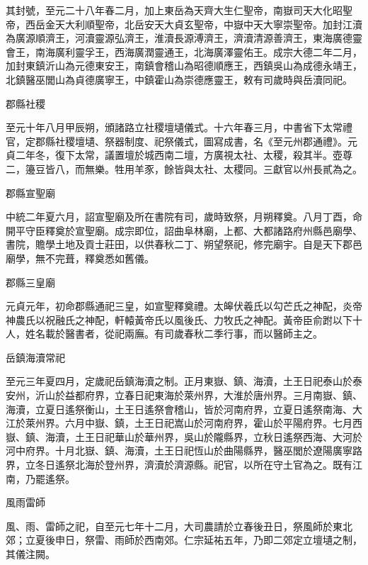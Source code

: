 \begin{pinyinscope}
 其封號，至元二十八年春二月，加上東岳為天齊大生仁聖帝，南嶽司天大化昭聖帝，西岳金天大利順聖帝，北岳安天大貞玄聖帝，中嶽中天大寧崇聖帝。加封江瀆為廣源順濟王，河瀆靈源弘濟王，淮瀆長源溥濟王，濟瀆清源善濟王，東海廣德靈會王，南海廣利靈孚王，西海廣潤靈通王，北海廣澤靈佑王。成宗大德二年二月，加封東鎮沂山為元德東安王，南鎮會稽山為昭德順應王，西鎮吳山為成德永靖王，北鎮醫巫閭山為貞德廣寧王，中鎮霍山為崇德應靈王，敕有司歲時與岳瀆同祀。



 郡縣社稷



 至元十年八月甲辰朔，頒諸路立社稷壇壝儀式。十六年春三月，中書省下太常禮官，定郡縣社稷壇壝、祭器制度、祀祭儀式，圖寫成書，名《至元州郡通禮》。元貞二年冬，復下太常，議置壇於城西南二壇，方廣視太社、太稷，殺其半。壺尊二，籩豆皆八，而無樂。牲用羊豕，餘皆與太社、太稷同。三獻官以州長貳為之。



 郡縣宣聖廟



 中統二年夏六月，詔宣聖廟及所在書院有司，歲時致祭，月朔釋奠。八月丁酉，命開平守臣釋奠於宣聖廟。成宗即位，詔曲阜林廟，上都、大都諸路府州縣邑廟學、書院，贍學土地及貢士莊田，以供春秋二丁、朔望祭祀，修完廟宇。自是天下郡邑廟學，無不完葺，釋奠悉如舊儀。



 郡縣三皇廟



 元貞元年，初命郡縣通祀三皇，如宣聖釋奠禮。太皞伏羲氏以勾芒氏之神配，炎帝神農氏以祝融氏之神配，軒轅黃帝氏以風後氏、力牧氏之神配。黃帝臣俞跗以下十人，姓名載於醫書者，從祀兩廡。有司歲春秋二季行事，而以醫師主之。



 岳鎮海瀆常祀



 至元三年夏四月，定歲祀岳鎮海瀆之制。正月東嶽、鎮、海瀆，土王日祀泰山於泰安州，沂山於益都府界，立春日祀東海於萊州界，大淮於唐州界。三月南嶽、鎮、海瀆，立夏日遙祭衡山，土王日遙祭會稽山，皆於河南府界，立夏日遙祭南海、大江於萊州界。六月中嶽、鎮，土王日祀嵩山於河南府界，霍山於平陽府界。七月西嶽、鎮、海瀆，土王日祀華山於華州界，吳山於隴縣界，立秋日遙祭西海、大河於河中府界。十月北嶽、鎮、海瀆，土王日祀恆山於曲陽縣界，醫巫閭於遼陽廣寧路界，立冬日遙祭北海於登州界，濟瀆於濟源縣。祀官，以所在守土官為之。既有江南，乃罷遙祭。



 風雨雷師



 風、雨、雷師之祀，自至元七年十二月，大司農請於立春後丑日，祭風師於東北郊；立夏後申日，祭雷、雨師於西南郊。仁宗延祐五年，乃即二郊定立壇壝之制，其儀注闕。




\end{pinyinscope}
